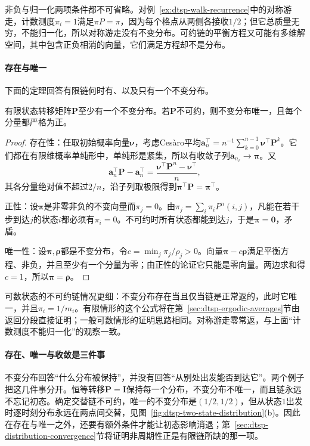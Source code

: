 非负与归一化两项条件都不可省略。对例~\ref{ex:dtsp-walk-recurrence}中的对称游走，计数测度$\pi_i=1$满足$\pi P=\pi$，因为每个格点从两侧各接收$1/2$；但它总质量无穷，不能归一化，所以对称游走没有不变分布。可约链的平衡方程又可能有多维解空间，其中包含正负相消的向量，它们满足方程却不是分布。

\paragraph{存在与唯一}
下面的定理回答有限链何时有、以及只有一个不变分布。

\begin{theorem}[有限链的不变分布]
  \label{thm:dtsp-finite-invariant}
  有限状态转移矩阵$\bm P$至少有一个不变分布。若$\bm P$不可约，则不变分布唯一，且每个分量都严格为正。
\end{theorem}

\begin{proof}
存在性：任取初始概率向量$\bm\nu$，考虑Ces\`aro平均$\bm a_n^{\top}=n^{-1}\sum_{k=0}^{n-1}\bm\nu^{\top}\bm P^k$。它们都在有限维概率单纯形中，单纯形是紧集，所以有收敛子列$\bm a_{n_\ell}\to\bm\pi$。又
\[
  \bm a_n^{\top}\bm P-\bm a_n^{\top}=\frac{\bm\nu^{\top}\bm P^n-\bm\nu^{\top}}{n},
\]
其各分量绝对值不超过$2/n$，沿子列取极限得到$\bm\pi^{\top}\bm P=\bm\pi^{\top}$。

正性：设$\bm\pi$是非零非负的不变向量而$\pi_j=0$。由$\pi_j=\sum_i\pi_iP^n(i,j)$，凡能在若干步到达$j$的状态$i$都必须有$\pi_i=0$。不可约时所有状态都能到达$j$，于是$\bm\pi=\bm0$，矛盾。

唯一性：设$\bm\pi,\bm\rho$都是不变分布，令$c=\min_j\pi_j/\rho_j>0$。向量$\bm\pi-c\bm\rho$满足平衡方程、非负，并且至少有一个分量为零；由正性的论证它只能是零向量。两边求和得$c=1$，所以$\bm\pi=\bm\rho$。
\end{proof}

可数状态的不可约链情况更细：不变分布存在当且仅当链是正常返的，此时它唯一，并且$\pi_i=1/m_i$。有限情形的这个公式将在第~\ref{sec:dtsp-ergodic-averages}节由返回分段直接证明；一般可数情形的证明思路相同。对称游走零常返，与上面“计数测度不能归一化”的观察一致。

\paragraph{存在、唯一与收敛是三件事}
不变分布回答“什么分布被保持”，并没有回答“从别处出发能否到达它”。两个例子把这几件事分开。恒等转移$\bm P=\bm I$保持每一个分布，不变分布不唯一，而且链永远不忘记初态。确定交替链不可约，唯一的不变分布是$(1/2,1/2)$，但从状态$1$出发时逐时刻分布永远在两点间交替，见图~\ref{fig:dtsp-two-state-distribution}(b)。因此在存在与唯一之外，还要有额外条件才能让初态影响消退；第~\ref{sec:dtsp-distribution-convergence}节将证明非周期性正是有限链所缺的那一项。

